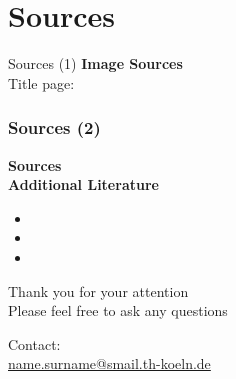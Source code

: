\documentclass[9pt, xcolor=table]{beamer}
\makeatletter
\newcommand{\Contactmail}{\url{name.surname@smail.th-koeln.de}}
\makeatother
\begin{document}
\section{Sources}
%
\begin{frame}{Sources (1)}
	\textbf{Image Sources}\\[2ex]
	\small Title page:
	\vspace{2ex}
	
	\printbibliography[keyword=pic]
\end{frame}
%
\begin{frame}
	\frametitle{Sources (2)}
	\textbf{Sources}\\
	\printbibliography[keyword=inf]
	\vfill
	\textbf{Additional Literature}
	\small
	\begin{itemize}
		\item {}
		\item {}
		\item {}
	\end{itemize}
\end{frame}
%
\begin{frame}{}
	\begin{center}
		\Large Thank you for your attention\\[2ex] 
		\small Please feel free to ask any questions
		\vspace{10ex}
		
		Contact:\\
		\Contactmail
	\end{center}
\end{frame}
%
\end{document}
